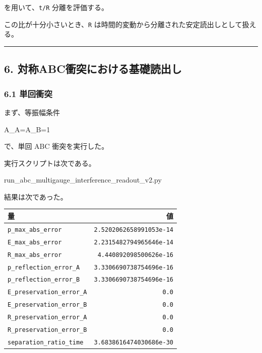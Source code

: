 \documentclass[
  a4paper,
]{article}
\newenvironment{Shaded}{}{}
\newcommand{\NormalTok}[1]{#1}
\newcounter{none} %
\begin{document}
を用いて、\texttt{t/R} 分離を評価する。

この比が十分小さいとき、\texttt{R}
は時間的変動から分離された安定読出しとして扱える。

\begin{center}\rule{0.5\linewidth}{0.5pt}\end{center}

\subsection{6.
対称ABC衝突における基礎読出し}\label{ux5bfeux79f0abcux885dux7a81ux306bux304aux3051ux308bux57faux790eux8aadux51faux3057}

\subsubsection{6.1 単回衝突}\label{ux5358ux56deux885dux7a81}

まず、等振幅条件

\begin{Shaded}
\begin{Highlighting}[]
\NormalTok{A\_A=A\_B=1}
\end{Highlighting}
\end{Shaded}

で、単回 ABC 衝突を実行した。

実行スクリプトは次である。

\begin{Shaded}
\begin{Highlighting}[]
\NormalTok{run\_abc\_multigauge\_interference\_readout\_v2.py}
\end{Highlighting}
\end{Shaded}

結果は次であった。

{\def\LTcaptype{none} %
\begin{longtable}[]{@{}lr@{}}
\toprule\noalign{}
量 & 値 \\
\midrule\noalign{}
\endhead
\bottomrule\noalign{}
\endlastfoot
\texttt{p\_max\_abs\_error} & \texttt{2.5202062658991053e-14} \\
\texttt{E\_max\_abs\_error} & \texttt{2.2315482794965646e-14} \\
\texttt{R\_max\_abs\_error} & \texttt{4.440892098500626e-16} \\
\texttt{p\_reflection\_error\_A} & \texttt{3.3306690738754696e-16} \\
\texttt{p\_reflection\_error\_B} & \texttt{3.3306690738754696e-16} \\
\texttt{E\_preservation\_error\_A} & \texttt{0.0} \\
\texttt{E\_preservation\_error\_B} & \texttt{0.0} \\
\texttt{R\_preservation\_error\_A} & \texttt{0.0} \\
\texttt{R\_preservation\_error\_B} & \texttt{0.0} \\
\texttt{separation\_ratio\_time} & \texttt{3.6838616474030686e-30} \\
\end{longtable}
}
\end{document}

